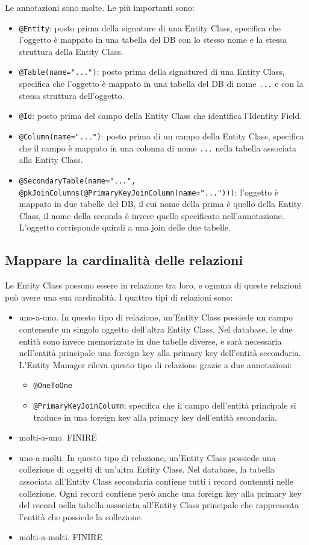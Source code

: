 Le annotazioni sono molte. Le più importanti sono:
\begin{itemize}
    \item \verb|@Entity|: posto prima della signature di una Entity Class, specifica che l'oggetto è mappato in una tabella del DB con lo stesso nome e la stessa struttura della Entity Class.
    \item \verb|@Table(name="...")|: posto prima della signatured di una Entity Class, specifica che l'oggetto è mappato in una tabella del DB di nome \verb|...| e con la stessa struttura dell'oggetto.
    \item \verb|@Id|: posto prima del campo della Entity Class che identifica l'Identity Field.
    \item \verb|@Column(name="...")|: posto prima di un campo della Entity Class, specifica che il campo è mappato in una colonna di nome \verb|...| nella tabella associata alla Entity Class.
    \item \verb|@SecondaryTable(name="...", @pkJoinColumns(@PrimaryKeyJoinColumn(name="...")))|: l'oggetto è mappato in due tabelle del DB, il cui nome della prima è quello della Entity Class, il nome della seconda è invece quello specificato nell'annotazione. L'oggetto corrisponde quindi a una join delle due tabelle.
\end{itemize}

\subsection{Mappare la cardinalità delle relazioni}
Le Entity Class possono essere in relazione tra loro, e ognuna di queste relazioni può avere una sua cardinalità.
I quattro tipi di relazioni sono:
\begin{itemize}
    \item uno-a-uno. In questo tipo di relazione, un'Entity Class possiede un campo contenente un singolo oggetto dell'altra Entity Class.
    Nel database, le due entità sono invece memorizzate in due tabelle diverse, e sarà necessaria nell'entità principale una foreign key alla primary key dell'entità secondaria.\\
    L'Entity Manager rileva questo tipo di relazione grazie a due annotazioni:
    \begin{itemize}
        \item \verb|@OneToOne|
        \item \verb|@PrimaryKeyJoinColumn|: specifica che il campo dell'entità principale si traduce in una foreign key alla primary key dell'entità secondaria.
    \end{itemize}
    \item molti-a-uno. FINIRE
    \item uno-a-molti. In questo tipo di relazione, un'Entity Class possiede una collezione di oggetti di un'altra Entity Class.
    Nel database, la tabella associata all'Entity Class secondaria contiene tutti i record contenuti nelle collezione. Ogni record contiene però anche una foreign key alla primary key del record nella tabella associata all'Entity Class principale che rappresenta l'entità che possiede la collezione.
    \item molti-a-molti. FINIRE
\end{itemize}